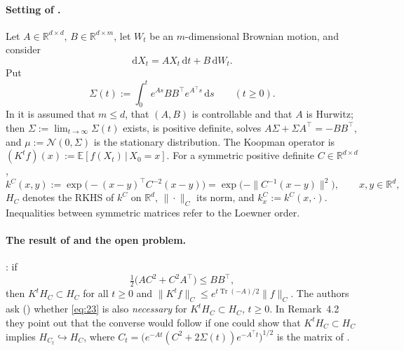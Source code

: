 \documentclass[11pt]{article}
\theoremstyle{definition}
\theoremstyle{remark}
\newcommand{\R}{\mathbb{R}}
\newcommand{\Tr}{\operatorname{Tr}}
\newcommand{\dd}{\,\mathrm{d}}
\newcommand{\tp}{\top}
\begin{document}
\paragraph{Setting of \cite{PSWPN}.}
Let $A\in\R^{d\times d}$, $B\in\R^{d\times m}$, let $W_t$ be an $m$-dimensional Brownian motion, and consider
\begin{equation}\label{eq:sde}
\mathrm{d}X_t=AX_t\,\mathrm{d}t+B\,\mathrm{d}W_t .
\end{equation}
Put
\begin{equation}\label{eq:Sigmat}
\Sigma(t):=\int_0^t e^{As}BB^\tp e^{A^\tp s}\dd s\qquad(t\ge 0).
\end{equation}
In \cite{PSWPN} it is assumed that $m\le d$, that $(A,B)$ is controllable and that $A$ is Hurwitz; then
$\Sigma:=\lim_{t\to\infty}\Sigma(t)$ exists, is positive definite, solves $A\Sigma+\Sigma A^\tp=-BB^\tp$, and
$\mu:=\mathcal N(0,\Sigma)$ is the stationary distribution. The Koopman operator is
$(K^tf)(x):=\mathbb E[f(X_t)\,|\,X_0=x]$. For a symmetric positive definite $C\in\R^{d\times d}$,
\[
k^C(x,y):=\exp\bigl(-(x-y)^\tp C^{-2}(x-y)\bigr)=\exp\bigl(-\|C^{-1}(x-y)\|^2\bigr),\qquad x,y\in\R^d,
\]
$H_C$ denotes the RKHS of $k^C$ on $\R^d$, $\|\cdot\|_C$ its norm, and $k^C_x:=k^C(x,\cdot)$. Inequalities between
symmetric matrices refer to the Loewner order.

\paragraph{The result of \cite{PSWPN} and the open problem.}
\cite[Theorem~2.1]{PSWPN}: if
\begin{equation}\tag{2.3}\label{eq:23}
\tfrac12\bigl(AC^2+C^2A^\tp\bigr)\le BB^\tp ,
\end{equation}
then $K^tH_C\subset H_C$ for all $t\ge0$ and $\|K^tf\|_C\le e^{t\Tr(-A)/2}\|f\|_C$. The authors ask
(\cite[Abstract, Remark~2.2(c), Remark~4.2]{PSWPN}) whether \eqref{eq:23} is also \emph{necessary} for
$K^tH_C\subset H_C$, $t\ge 0$. In Remark~4.2 they point out that the converse would follow if one could show
that $K^tH_C\subset H_C$ implies $H_{C_t}\hookrightarrow H_C$, where
$C_t=\bigl(e^{-At}(C^2+2\Sigma(t))e^{-A^\tp t}\bigr)^{1/2}$ is the matrix of \cite[(4.1)]{PSWPN}.
\end{document}
